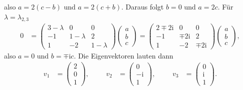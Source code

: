 \documentclass[english, parskip=full]{scrartcl}
\renewcommand{\i}{\text{i}}
\begin{document}
also $a=2(c-b)$ und $a=2(c+b)$.
Daraus folgt $b=0$ und $a=2c$.
Für $\lambda=\lambda_{2,3}$
\begin{align}
0 &= \begin{pmatrix}
3-\lambda & 0 & 0 \\ -1 & 1-\lambda & 2 \\ 1 & -2 & 1-\lambda
\end{pmatrix} \begin{pmatrix}
a \\ b \\ c
\end{pmatrix} = \begin{pmatrix}
2 \mp 2\i & 0 & 0 \\ -1 & \mp 2\i & 2 \\ 1 & -2 & \mp 2\i
\end{pmatrix} \begin{pmatrix}
a \\ b \\ c
\end{pmatrix},
\end{align} 
also $a=0$ und $b=\mp \i c$.
Die Eigenvektoren lauten dann
\begin{align}
v_1 &= \begin{pmatrix}
2 \\ 0 \\ 1
\end{pmatrix}, &&& v_2 &= \begin{pmatrix}
0 \\ -\i \\ 1
\end{pmatrix}, &&& v_3 &= \begin{pmatrix}
0 \\ \i \\ 1
\end{pmatrix}.
\end{align}
\end{document}
